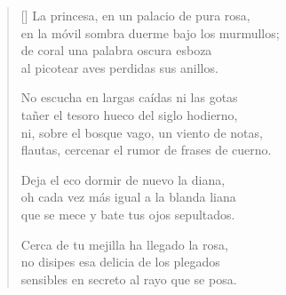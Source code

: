 



\settowidth{\versewidth}{flautas, cercenar el rumor de frases de cuerno.}

\bigskip

\begin{verse}[\versewidth]
  La princesa, en un palacio de pura rosa, \\
  en la móvil sombra duerme bajo los murmullos; \\
  de coral una palabra oscura esboza \\
  al picotear aves perdidas sus anillos.

  No escucha en largas caídas ni las gotas \\
  tañer el tesoro hueco del siglo hodierno, \\
  ni, sobre el bosque vago, un viento de notas, \\
  flautas, cercenar el rumor de frases de cuerno.

  Deja el eco dormir de nuevo la diana, \\
  oh cada vez más igual a la blanda liana \\
  que se mece y bate tus ojos sepultados.

  Cerca de tu mejilla ha llegado la rosa, \\
  no disipes esa delicia de los plegados \\
  sensibles en secreto al rayo que se posa.
\end{verse}

\newpage



\settowidth{\versewidth}{Elle n'écoute ni les gouttes, dans leurs chutes,}

\bigskip


